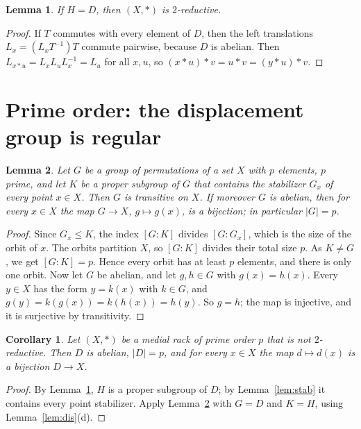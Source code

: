 \documentclass[11pt]{article}
\newtheorem{lemma}{Lemma}
\newtheorem{corollary}{Corollary}
\theoremstyle{definition}
\theoremstyle{remark}
\begin{document}
\begin{lemma}\label{lem:top}
If $H=D$, then $(X,*)$ is $2$-reductive.
\end{lemma}

\begin{proof}
If $T$ commutes with every element of $D$, then the left translations
$L_x=(L_xT^{-1})T$ commute pairwise, because $D$ is abelian. Then
$L_{x*u}=L_xL_uL_x^{-1}=L_u$ for all $x,u$, so
$(x*u)*v=u*v=(y*u)*v$.
\end{proof}

\section{Prime order: the displacement group is regular}\label{sec:prime}

\begin{lemma}\label{lem:prime}
Let $G$ be a group of permutations of a set $X$ with $p$ elements, $p$ prime,
and let $K$ be a proper subgroup of $G$ that contains the stabilizer $G_x$ of
every point $x\in X$. Then $G$ is transitive on $X$. If moreover $G$ is
abelian, then for every $x\in X$ the map $G\to X$, $g\mapsto g(x)$, is a
bijection; in particular $|G|=p$.
\end{lemma}

\begin{proof}
Since $G_x\le K$, the index $[G:K]$ divides $[G:G_x]$, which is the size of
the orbit of $x$. The orbits partition $X$, so $[G:K]$ divides their total
size $p$. As $K\ne G$, we get $[G:K]=p$. Hence every orbit has at least $p$
elements, and there is only one orbit. Now let $G$ be abelian, and let
$g,h\in G$ with $g(x)=h(x)$. Every $y\in X$ has the form $y=k(x)$ with $k\in
G$, and $g(y)=k(g(x))=k(h(x))=h(y)$. So $g=h$; the map is injective, and it is
surjective by transitivity.
\end{proof}

\begin{corollary}\label{cor:regular}
Let $(X,*)$ be a medial rack of prime order $p$ that is not $2$-reductive.
Then $D$ is abelian, $|D|=p$, and for every $x\in X$ the map $d\mapsto d(x)$
is a bijection $D\to X$.
\end{corollary}

\begin{proof}
By Lemma~\ref{lem:top}, $H$ is a proper subgroup of $D$; by
Lemma~\ref{lem:stab} it contains every point stabilizer. Apply
Lemma~\ref{lem:prime} with $G=D$ and $K=H$, using Lemma~\ref{lem:dis}(d).
\end{proof}
\end{document}
